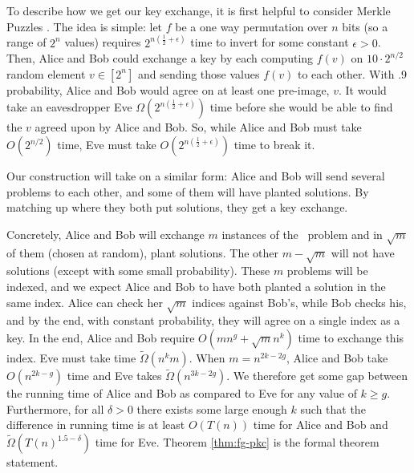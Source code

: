 To describe how we get our key exchange, it is first helpful to consider Merkle Puzzles \cite{Merkle78,BGI08,optimalMerklePuzzles}. The idea is simple: let $f$ be a one way permutation over $n$ bits (so a range of $2^n$ values) requires $2^{n(\frac{1}{2}+\epsilon)}$ time to invert for some constant $\epsilon>0$. Then, Alice and Bob could exchange a key by each computing $f(v)$ on  $10\cdot2^{n/2}$ random element $v \in [2^{n}]$ and sending those values $f(v)$ to each other. With .9 probability, Alice and Bob would agree on at least one pre-image, $v$. It would take an eavesdropper Eve $\Omega(2^{n(\frac{1}{2}+\epsilon)})$ time before she would be able to find the $v$ agreed upon by Alice and Bob. So, while Alice and Bob must take $O(2^{n/2})$ time, Eve must take $O(2^{n(\frac{1}{2}+\epsilon)})$ time to break it. 



Our construction will take on a similar form: Alice and Bob will send several problems to each other, and some of them will have planted solutions. By matching up where they both put solutions, they get a key exchange.

Concretely, Alice and Bob will exchange $m$ instances of the \zkclique~problem and in $\sqrt{m}$ of them (chosen at random), plant solutions. The other $m - \sqrt{m}$ will not have solutions (except with some small probability). These $m$ problems will be indexed, and we expect Alice and Bob to have both planted a solution in the same index. Alice can check her $\sqrt{m}$ indices against Bob's, while Bob checks his, and by the end, with constant probability, they will agree on a single index as a key. In the end, Alice and Bob require $O(mn^g + \sqrt{m}n^{k})$ time to exchange this index.  Eve must take time $\tilde{\Omega}(n^{k}m)$. When  $m = n^{2k-2g}$, Alice and Bob take $O(n^{2k-g})$ time and Eve takes $\tilde{\Omega}(n^{3k-2g})$. We therefore get some gap between the running time of Alice and Bob as compared to Eve for any value of $k\geq g$. Furthermore, for all $\delta>0$ there exists some large enough $k$ such that the difference in running time is at least $O(T(n))$ time for Alice and Bob and $\tilde{\Omega}(T(n)^{1.5-\delta})$ time for Eve. Theorem \ref{thm:fg-pkc} is the formal theorem statement.




